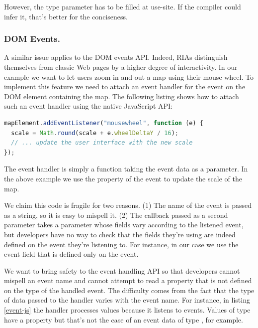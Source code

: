 \documentclass[runningheads,a4paper]{llncs}
\begin{document}
However, the type parameter  has to be filled at use-site. If the compiler could infer it,
that’s better for the conciseness.

\subsubsection{DOM Events.}


A similar issue applies to the DOM events API. Indeed, RIAs distinguish themselves from classic Web
pages by a higher degree of interactivity. In our example we want to let users zoom in and out a map
using their mouse wheel. To implement this feature we need to attach an event handler for the
 event on the DOM element containing the map. The following listing shows how to
attach such an event handler using the native JavaScript API:

\begin{lstlisting}[language=JavaScript,label=event-js,caption=Native JavaScript API to handle
events]
mapElement.addEventListener("mousewheel", function (e) {
  scale = Math.round(scale + e.wheelDeltaY / 16);
  // ... update the user interface with the new scale
});
\end{lstlisting}

The event handler is simply a function taking the event data as a parameter. In the above example we
use the  property of the event to update the scale of the map.

We claim this code is fragile for two reasons. (1) The name of the event is passed as a string, so
it is easy to mispell it. (2) The callback passed as a second parameter takes a parameter 
whose fields vary according to the listened event, but developers have no way to check that the
fields they’re using are indeed defined on the event they’re listening to. For instance, in our case
we use the  event field that is defined only on the  event.

We want to bring safety to the event handling API so that developers cannot mispell an event name
and cannot attempt to read a property that is not defined on the type of the handled event. The
difficulty comes from the fact that the type of data passed to the handler varies with the event
name. For instance, in listing \ref{event-js} the handler processes  values
because it listens to  events. Values of type  have a
property  but that’s not the case of an event data of type ,
for example.
\end{document}
